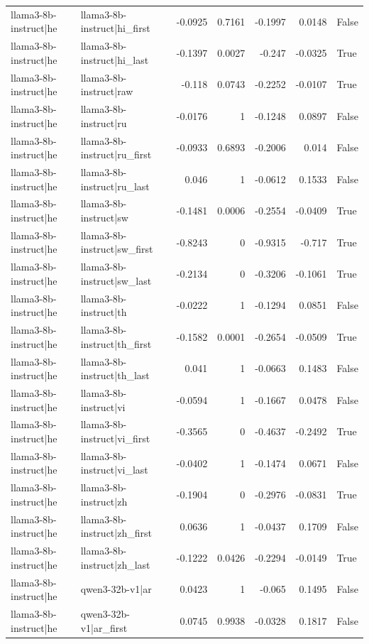 \begin{table}
\begin{tabular}{l l r r r r l}
llama3-8b-instruct|he & llama3-8b-instruct|hi_first & -0.0925 & 0.7161 & -0.1997 & 0.0148 & False \\
llama3-8b-instruct|he & llama3-8b-instruct|hi_last & -0.1397 & 0.0027 & -0.247 & -0.0325 & True \\
llama3-8b-instruct|he & llama3-8b-instruct|raw & -0.118 & 0.0743 & -0.2252 & -0.0107 & True \\
llama3-8b-instruct|he & llama3-8b-instruct|ru & -0.0176 & 1 & -0.1248 & 0.0897 & False \\
llama3-8b-instruct|he & llama3-8b-instruct|ru_first & -0.0933 & 0.6893 & -0.2006 & 0.014 & False \\
llama3-8b-instruct|he & llama3-8b-instruct|ru_last & 0.046 & 1 & -0.0612 & 0.1533 & False \\
llama3-8b-instruct|he & llama3-8b-instruct|sw & -0.1481 & 0.0006 & -0.2554 & -0.0409 & True \\
llama3-8b-instruct|he & llama3-8b-instruct|sw_first & -0.8243 & 0 & -0.9315 & -0.717 & True \\
llama3-8b-instruct|he & llama3-8b-instruct|sw_last & -0.2134 & 0 & -0.3206 & -0.1061 & True \\
llama3-8b-instruct|he & llama3-8b-instruct|th & -0.0222 & 1 & -0.1294 & 0.0851 & False \\
llama3-8b-instruct|he & llama3-8b-instruct|th_first & -0.1582 & 0.0001 & -0.2654 & -0.0509 & True \\
llama3-8b-instruct|he & llama3-8b-instruct|th_last & 0.041 & 1 & -0.0663 & 0.1483 & False \\
llama3-8b-instruct|he & llama3-8b-instruct|vi & -0.0594 & 1 & -0.1667 & 0.0478 & False \\
llama3-8b-instruct|he & llama3-8b-instruct|vi_first & -0.3565 & 0 & -0.4637 & -0.2492 & True \\
llama3-8b-instruct|he & llama3-8b-instruct|vi_last & -0.0402 & 1 & -0.1474 & 0.0671 & False \\
llama3-8b-instruct|he & llama3-8b-instruct|zh & -0.1904 & 0 & -0.2976 & -0.0831 & True \\
llama3-8b-instruct|he & llama3-8b-instruct|zh_first & 0.0636 & 1 & -0.0437 & 0.1709 & False \\
llama3-8b-instruct|he & llama3-8b-instruct|zh_last & -0.1222 & 0.0426 & -0.2294 & -0.0149 & True \\
llama3-8b-instruct|he & qwen3-32b-v1|ar & 0.0423 & 1 & -0.065 & 0.1495 & False \\
llama3-8b-instruct|he & qwen3-32b-v1|ar_first & 0.0745 & 0.9938 & -0.0328 & 0.1817 & False \\

\end{tabular}
\end{table}

